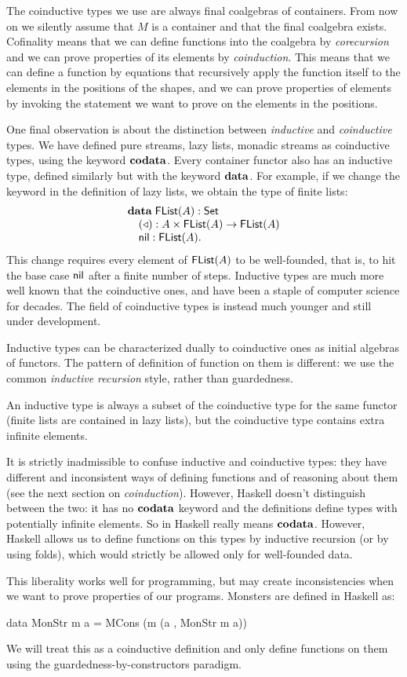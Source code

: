 The coinductive types we use are always final coalgebras of containers.
From now on we silently assume that $M$ is a container and that the final coalgebra exists.
Cofinality means that we can define functions into the coalgebra by {\em corecursion} and we can prove properties of its elements by {\em coinduction}.
This means that we can define a function by equations that recursively apply the function itself to the elements in the positions of the shapes, and we can prove properties of elements by invoking the statement we want to prove on the elements in the positions.


One final observation is about the distinction between {\em inductive} and {\em coinductive} types.
We have defined pure streams, lazy lists, monadic streams as coinductive types, using the keyword $\mathbf{codata}$.
Every container functor also has an inductive type, defined similarly but with the keyword $\mathbf{data}$.
For example, if we change the keyword in the definition of lazy lists, we obtain the type of finite lists:
$$
\begin{array}[t]{l}
\mathbf{data}\;
\mathsf{FList}(A):\mathsf{Set}\\
\quad (\triangleleft): A\times \mathsf{FList}(A)\rightarrow\mathsf{FList}(A)\\
\quad \mathsf{nil}: \mathsf{FList}(A).
\end{array}
$$
This change requires every element of $\mathsf{FList}(A)$ to be well-founded, that is, to hit the base case $\mathsf{nil}$ after a finite number of steps.
Inductive types are much more well known that the coinductive ones, and have been a staple of computer science for decades.
The field of coinductive types is instead much younger and still under development.

Inductive types can be characterized dually to coinductive ones as initial algebras of functors.
The pattern of definition of function on them is different: we use the common {\em inductive recursion} style, rather than guardedness.

An inductive type is always a subset of the coinductive type for the same functor (finite lists are contained in lazy lists), but the coinductive type contains extra infinite elements.

It is strictly inadmissible to confuse inductive and coinductive types: they have different and inconsistent ways of defining functions and of reasoning about them (see the next section on {\em coinduction}).
However, Haskell doesn't distinguish between the two: it has no $\mathbf{codata}$ keyword and the  definitions define types with potentially infinite elements.
So  in Haskell really means $\mathbf{codata}$.
However, Haskell allows us to define functions on this types by inductive recursion (or by using folds), which would strictly be allowed only for well-founded data.

This liberality works well for programming, but may create inconsistencies when we want to prove properties of our programs.
Monsters are defined in Haskell as:
\begin{haskell}
data MonStr m a = MCons (m (a , MonStr m a))
\end{haskell}
We will treat this as a coinductive definition and only define functions on them using the guardedness-by-constructors paradigm.

